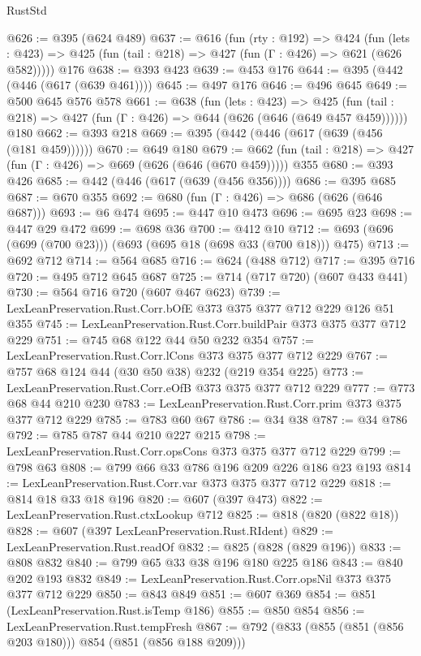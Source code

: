 \begin{lexlean}{RustStd}
\begin{coremodule}
@626 := @395 (@624 @489)
@637 := @616
    (fun (rty : @192) =>
    @424
      (fun (lets : @423) => @425 (fun (tail : @218) => @427 (fun (Γ : @426) => @621 (@626 @582)))))
    @176
@638 := @393 @423
@639 := @453 @176
@644 := @395 (@442 (@446 (@617 (@639 @461))))
@645 := @497 @176
@646 := @496 @645
@649 := @500 @645 @576 @578
@661 := @638
    (fun (lets : @423) =>
    @425 (fun (tail : @218) => @427 (fun (Γ : @426) => @644 (@626 (@646 (@649 @457 @459))))))
    @180
@662 := @393 @218
@669 := @395 (@442 (@446 (@617 (@639 (@456 (@181 @459))))))
@670 := @649 @180
@679 := @662 (fun (tail : @218) => @427 (fun (Γ : @426) => @669 (@626 (@646 (@670 @459))))) @355
@680 := @393 @426
@685 := @442 (@446 (@617 (@639 (@456 @356))))
@686 := @395 @685
@687 := @670 @355
@692 := @680 (fun (Γ : @426) => @686 (@626 (@646 @687)))
@693 := @6 @474
@695 := @447 @10 @473
@696 := @695 @23
@698 := @447 @29 @472
@699 := @698 @36
@700 := @412 @10
@712 := @693 (@696 (@699 (@700 @23))) (@693 (@695 @18 (@698 @33 (@700 @18))) @475)
@713 := @692 @712
@714 := @564 @685
@716 := @624 (@488 @712)
@717 := @395 @716
@720 := @495 @712 @645 @687
@725 := @714 (@717 @720) (@607 @433 @441)
@730 := @564 @716 @720 (@607 @467 @623)
@739 := LexLeanPreservation.Rust.Corr.bOfE @373 @375 @377 @712 @229 @126 @51 @355
@745 := LexLeanPreservation.Rust.Corr.buildPair @373 @375 @377 @712 @229
@751 := @745 @68 @122 @44 @50 @232 @354
@757 := LexLeanPreservation.Rust.Corr.lCons @373 @375 @377 @712 @229
@767 := @757 @68 @124 @44 (@30 @50 @38) @232 (@219 @354 @225)
@773 := LexLeanPreservation.Rust.Corr.eOfB @373 @375 @377 @712 @229
@777 := @773 @68 @44 @210 @230
@783 := LexLeanPreservation.Rust.Corr.prim @373 @375 @377 @712 @229
@785 := @783 @60 @67
@786 := @34 @38
@787 := @34 @786
@792 := @785 @787 @44 @210 @227 @215
@798 := LexLeanPreservation.Rust.Corr.opsCons @373 @375 @377 @712 @229
@799 := @798 @63
@808 := @799 @66 @33 @786 @196 @209 @226 @186 @23 @193
@814 := LexLeanPreservation.Rust.Corr.var @373 @375 @377 @712 @229
@818 := @814 @18 @33 @18 @196
@820 := @607 (@397 @473)
@822 := LexLeanPreservation.Rust.ctxLookup @712
@825 := @818 (@820 (@822 @18))
@828 := @607 (@397 LexLeanPreservation.Rust.RIdent)
@829 := LexLeanPreservation.Rust.readOf
@832 := @825 (@828 (@829 @196))
@833 := @808 @832
@840 := @799 @65 @33 @38 @196 @180 @225 @186
@843 := @840 @202 @193 @832
@849 := LexLeanPreservation.Rust.Corr.opsNil @373 @375 @377 @712 @229
@850 := @843 @849
@851 := @607 @369
@854 := @851 (LexLeanPreservation.Rust.isTemp @186)
@855 := @850 @854
@856 := LexLeanPreservation.Rust.tempFresh
@867 := @792 (@833 (@855 (@851 (@856 @203 @180))) @854 (@851 (@856 @188 @209)))

\end{coremodule}
\end{lexlean}

